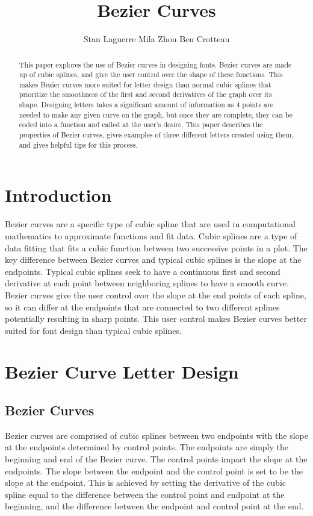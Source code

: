 \documentclass{article}
\title{Bezier Curves}
\author{Stan Laguerre Mila Zhou Ben Crotteau}
\begin{document}
\maketitle

\begin{abstract}
This paper explores the use of Bezier curves in designing fonts. Bezier curves are made up of cubic splines, and give the user control over the shape of these functions. This makes Bezier curves more suited for letter design than normal cubic splines that prioritize the smoothness of the first and second derivatives of the graph over its shape. Designing letters takes a significant amount of information as 4 points are needed to make any given curve on the graph, but once they are complete, they can be coded into a function and called at the user's desire. This paper describes the properties of Bezier curves, gives examples of three different letters created using them, and gives helpful tips for this process.
\end{abstract}

\section{Introduction}

Bezier curves are a specific type of cubic spline that are used in computational mathematics to approximate functions and fit data. Cubic splines are a type of data fitting that fits a cubic function between two successive points in a plot. The key difference between Bezier curves and typical cubic splines is the slope at the endpoints. Typical cubic splines seek to have a continuous first and second derivative at each point between neighboring splines to have a smooth curve. Bezier curves give the user control over the slope at the end points of each spline, so it can differ at the endpoints that are connected to two different splines potentially resulting in sharp points. This user control makes Bezier curves better suited for font design than typical cubic splines.

\section{Bezier Curve Letter Design}

\subsection{Bezier Curves}

Bezier curves are comprised of cubic splines between two endpoints with the slope at the endpoints determined by control points. The endpoints are simply the beginning and end of the Bezier curve. The control points impact the slope at the endpoints. The slope between the endpoint and the control point is set to be the slope at the endpoint. This is achieved by setting the derivative of the cubic spline equal to the difference between the control point and endpoint at the beginning, and the difference between the endpoint and control point at the end. 
\end{document}
